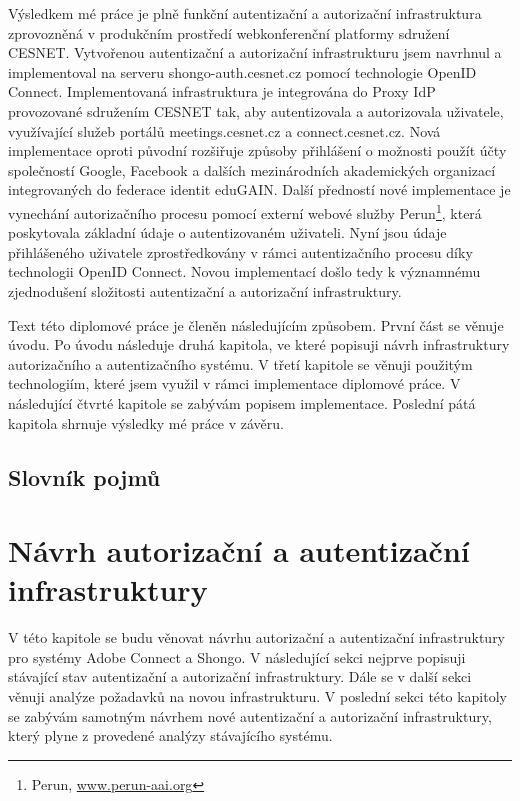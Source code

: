 \documentclass[
  printed, %
  twoside, %
  table,   %
  nolof,     %
  nolot,     %
]{fithesis3}
\begin{document}
Výsledkem mé práce je plně funkční autentizační a autorizační infrastruktura zprovozněná v produkčním prostředí webkonferenční platformy sdružení CESNET. Vytvořenou autentizační a autorizační infrastrukturu jsem navrhnul a implementoval na serveru shongo-auth.cesnet.cz pomocí technologie OpenID Connect. Implementovaná infrastruktura je integrována do Proxy IdP provozované sdružením CESNET tak, aby autentizovala a autorizovala uživatele, využívající služeb portálů meetings.cesnet.cz a connect.cesnet.cz. Nová implementace oproti původní rozšiřuje způsoby přihlášení o možnosti použít účty společností Google, Facebook a dalších mezinárodních akademických organizací integrovaných do federace identit eduGAIN. Další předností nové implementace je vynechání autorizačního procesu pomocí externí webové služby Perun\footnote{Perun, \url{www.perun-aai.org}}, která poskytovala základní údaje o autentizovaném uživateli. Nyní jsou údaje přihlášeného uživatele zprostředkovány v rámci autentizačního procesu díky technologii OpenID Connect. Novou implementací došlo tedy k významnému zjednodušení složitosti autentizační a autorizační infrastruktury. \par

Text této diplomové práce je členěn následujícím způsobem. První část se věnuje úvodu. Po úvodu následuje druhá kapitola, ve které popisuji návrh infrastruktury autorizačního a autentizačního systému. V třetí kapitole se věnuji použitým technologiím, které jsem využil v rámci implementace diplomové práce. V následující čtvrté kapitole se zabývám popisem implementace. Poslední pátá kapitola shrnuje výsledky mé práce v závěru.  
\section{Slovník pojmů}

\chapter{Návrh autorizační a autentizační infrastruktury}
V této kapitole se budu věnovat návrhu autorizační a autentizační infrastruktury pro systémy Adobe Connect a Shongo. V následující sekci nejprve popisuji stávající stav autentizační a autorizační infrastruktury. Dále se v další sekci věnuji analýze požadavků na novou infrastrukturu. V poslední sekci této kapitoly se zabývám samotným návrhem nové autentizační a autorizační infrastruktury, který plyne z provedené analýzy stávajícího systému.    
\end{document}
